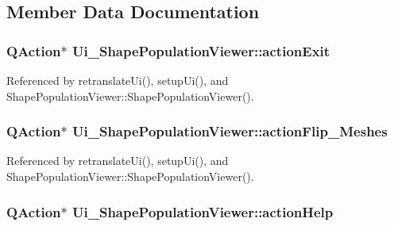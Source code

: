 \subsection{Member Data Documentation}
\hypertarget{class_ui___shape_population_viewer_ace554b35188e2266e75d55577875b171}{
\subsubsection[{action\-Exit}]{\setlength{\rightskip}{0pt plus 5cm}Q\-Action$\ast$ Ui\-\_\-\-Shape\-Population\-Viewer\-::action\-Exit}}\label{class_ui___shape_population_viewer_ace554b35188e2266e75d55577875b171}


Referenced by retranslate\-Ui(), setup\-Ui(), and Shape\-Population\-Viewer\-::\-Shape\-Population\-Viewer().

\hypertarget{class_ui___shape_population_viewer_a71a8abf27a03d8433b69f26859b37fbd}{
\subsubsection[{action\-Flip\-\_\-\-Meshes}]{\setlength{\rightskip}{0pt plus 5cm}Q\-Action$\ast$ Ui\-\_\-\-Shape\-Population\-Viewer\-::action\-Flip\-\_\-\-Meshes}}\label{class_ui___shape_population_viewer_a71a8abf27a03d8433b69f26859b37fbd}


Referenced by retranslate\-Ui(), setup\-Ui(), and Shape\-Population\-Viewer\-::\-Shape\-Population\-Viewer().

\hypertarget{class_ui___shape_population_viewer_a92290dc77004bc9ef295bce741137e7b}{
\subsubsection[{action\-Help}]{\setlength{\rightskip}{0pt plus 5cm}Q\-Action$\ast$ Ui\-\_\-\-Shape\-Population\-Viewer\-::action\-Help}}\label{class_ui___shape_population_viewer_a92290dc77004bc9ef295bce741137e7b}


